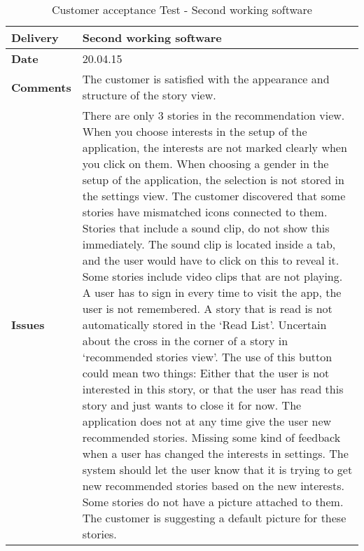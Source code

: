 \renewcommand{\arraystretch}{2}%
\begin{center}
	\begin{longtable}{ | p{4cm} | p{13cm} | }
		
		\caption[Customer acceptance test]{Customer acceptance Test - Second working software} \label{Tab:cattest4}\\
		\hline
		\textbf{Delivery} & Second working software\\ \hline
		\textbf{Date} & 20.04.15\\ \hline
		\textbf{Comments} & The customer is satisfied with the appearance and structure of the story view. 
		\\ \hline
		\textbf{Issues} & 
		There are only 3 stories in the recommendation view. When you choose interests in the setup of the application, the interests are not marked clearly when you click on them. When choosing a gender in the setup of the application, the selection is not stored in the settings view. The customer discovered that some stories have mismatched icons connected to them. Stories that include a sound clip, do not show this immediately. The sound clip is located inside a tab, and the user would have to click on this to reveal it. Some stories include video clips that are not playing. A user has to sign in every time to visit the app, the user is not remembered. A story that is read is not automatically stored in the ‘Read List’. Uncertain about the cross in the corner of a story in ‘recommended stories view’. The use of this button could mean two things: Either that the user is not interested in this story, or that the user has read this story and just wants to close it for now. The application does not at any time give the user new recommended stories. Missing some kind of feedback when a user has changed the interests in settings. The system should let the user know that it is trying to get new recommended stories based on the new interests. Some stories do not have a picture attached to them. The customer is suggesting a default picture for these stories.
		\\ \hline 	
	\end{longtable}
\end{center}

